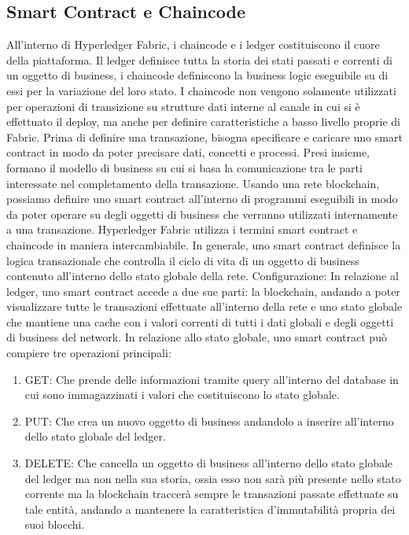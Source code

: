 \subsection{Smart Contract e Chaincode}
All'interno di Hyperledger Fabric, i chaincode e i ledger costituiscono il cuore della piattaforma. Il ledger definisce tutta la storia dei stati passati e correnti di un oggetto di business, i chaincode definiscono la business logic eseguibile su di essi per la variazione del loro stato. I chaincode non vengono solamente utilizzati per operazioni di transizione su strutture dati interne al canale in cui si è effettuato il deploy, ma anche per definire caratteristiche a basso livello proprie di Fabric. Prima di definire una transazione, bisogna specificare e caricare uno smart contract in modo da poter precisare dati, concetti e processi. Presi insieme, formano il modello di business su cui si basa la comunicazione tra le parti interessate nel completamento della transazione. Usando una rete blockchain, possiamo definire uno smart contract all'interno di programmi eseguibili in modo da poter operare su degli oggetti di business che verranno utilizzati internamente a una transazione. Hyperledger Fabric utilizza i termini smart contract e chaincode in maniera intercambiabile. In generale, uno smart contract definisce la logica transazionale che controlla il ciclo di vita di un oggetto di business contenuto all'interno dello stato globale della rete. Configurazione:
\newline
\newline
In relazione al ledger, uno smart contract accede a due sue parti: la blockchain, andando a poter visualizzare tutte le transazioni effettuate all'interno della rete e uno stato globale che mantiene una cache con i valori correnti di tutti i dati globali e degli oggetti di business del network. In relazione allo stato globale, uno smart contract può compiere tre operazioni principali:
\begin{enumerate}
    \item GET: Che prende delle informazioni tramite query all'interno del database in cui sono immagazzinati i valori che costituiscono lo stato globale. 
    \item PUT: Che crea un nuovo oggetto di business andandolo a inserire all'interno dello stato globale del ledger.
    \item DELETE: Che cancella un oggetto di business all'interno dello stato globale del ledger ma non nella sua storia, ossia esso non sarà più presente nello stato corrente ma la blockchain traccerà sempre le transazioni passate effettuate su tale entità, andando a mantenere la caratteristica d'immutabilità propria dei suoi blocchi.
\end{enumerate}

